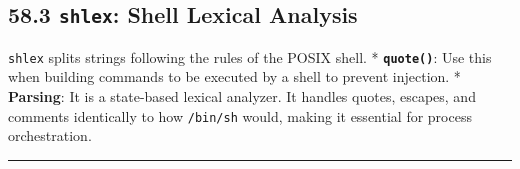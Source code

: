 \hypertarget{shlex-shell-lexical-analysis}{%
\subsection{\texorpdfstring{58.3 \texttt{shlex}: Shell Lexical
Analysis}{58.3 shlex: Shell Lexical Analysis}}\label{shlex-shell-lexical-analysis}}

\passthrough{\lstinline!shlex!} splits strings following the rules of
the POSIX shell. * \textbf{\passthrough{\lstinline!quote()!}}: Use this
when building commands to be executed by a shell to prevent injection. *
\textbf{Parsing}: It is a state-based lexical analyzer. It handles
quotes, escapes, and comments identically to how
\passthrough{\lstinline!/bin/sh!} would, making it essential for process
orchestration.

\begin{center}\rule{0.5\linewidth}{0.5pt}\end{center}
